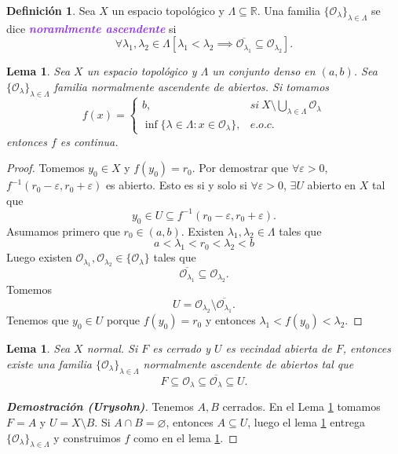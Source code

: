 \documentclass{article}
\newtheorem{lemma}[theorem]{Lema}
\theoremstyle{definition}
\newtheorem{definition}[theorem]{Definición}
\theoremstyle{remark}
\numberwithin{equation}{section}
\renewcommand{\O}{\mathcal{O}}
\newcommand{\R}{\mathbb{R}}
\newcommand{\e}{\varepsilon}
\newcommand{\lam}{\lambda}
\newcommand{\Lam}{\Lambda}
\renewcommand{\bar}{\overline}
\newcommand{\cor}[1]{\left[ #1 \right]}
\newcommand{\wea}[1]{\textcolor{BlueViolet}{\textbf{\emph{#1}}}}
\newcommand{\dem}[1]{\textbf{Demostración (#1)}}
\begin{document}
\begin{definition}
  Sea $X$ un espacio topológico y $\Lambda \subseteq \R$. Una familia $\{\O_\lambda\}_{\lambda\in\Lambda}$ se dice \wea{noramlmente ascendente} si \[\forall \lambda_1,\lambda_2 \in \Lambda \cor{\lambda_1 < \lambda_2 \implies \bar{\O_{\lambda_1}} \subseteq \O_{\lambda_2}}.\]
\end{definition}

\begin{lemma}\label{lemma Urysohn proof 1}
  Sea $X$ un espacio topológico y $\Lambda$ un conjunto denso en $(a,b)$. Sea $\{\O_\lambda\}_{\lambda\in\Lambda}$ familia normalmente ascendente de abiertos. Si tomamos
  \[f(x) = \begin{cases}
    b, &si \ X \setminus \bigcup_{\lambda\in\Lambda} \O_\lambda \\
    \inf\{\lambda\in\Lambda \colon x \in \O_\lambda\}, &e.o.c.
  \end{cases}\]
  entonces $f$ es continua.
\end{lemma}
\begin{proof}
  Tomemos $y_0 \in X$ y $f(y_0) = r_0$. Por demostrar que $\forall \e>0$, $f^{-1}(r_0-\e, r_0+\e)$ es abierto.
  Esto es si y solo si $\forall \e>0$, $\exists U$ abierto en $X$ tal que
  \[y_0 \in U \subseteq f^{-1}(r_0-\e,r_0+\e).\]
  Asumamos primero que $r_0 \in (a,b)$. Existen $\lam_1,\lam_2 \in \Lam$ tales que
  \[a < \lam_1 < r_0 < \lam_2 < b\]
  Luego existen $\O_{\lam_1}, \O_{\lam_2} \in \{\O_\lam\}$ tales que
  \[\bar{\O_{\lam_1}} \subseteq \O_{\lam_2}.\]
  Tomemos
  \[U = \O_{\lam_2} \setminus \bar{\O_{\lam_1}}.\]
  Tenemos que $y_0 \in U$ porque $f(y_0) = r_0$ y entonces $\lam_1 < f(y_0) < \lam_2$.
\end{proof}

\begin{lemma}\label{lemma Urysohn proof 2}
  Sea $X$ normal. Si $F$ es cerrado y $U$ es vecindad abierta de $F$, entonces existe una familia $\{\O_\lambda\}_{\lambda\in\Lambda}$ normalmente ascendente de abiertos tal que
  \[F \subseteq \O_\lambda \subseteq \bar{\O_\lambda} \subseteq U.\]
\end{lemma}

\begin{proof}[\dem{Urysohn}]%
  Tenemos $A,B$ cerrados. En el Lema \ref{lemma Urysohn proof 2} tomamos $F=A$ y $U = X \setminus B$.
  Si $A \cap B = \varnothing$, entonces $A \subseteq U$, luego el lema \ref{lemma Urysohn proof 2} entrega $\{\O_\lambda\}_{\lambda\in\Lambda}$ y construimos $f$ como en el lema \ref{lemma Urysohn proof 1}.
\end{proof}
\end{document}
